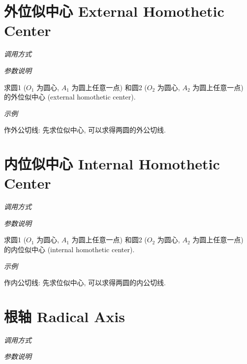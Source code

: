 \section{外位似中心 External Homothetic Center}

\emph{调用方式}

\begin{tcolorbox}{}
\end{tcolorbox}

\emph{参数说明}

求圆1 ($O_1$ 为圆心, $A_1$ 为圆上任意一点)
和圆2 ($O_2$ 为圆心, $A_2$ 为圆上任意一点) 
的外位似中心 (external homothetic center)\cite{HOMO}.

\emph{示例}

作外公切线: 先求位似中心, 可以求得两圆的外公切线.


\section{内位似中心 Internal Homothetic Center}

\emph{调用方式}

\begin{tcolorbox}{}
\end{tcolorbox}

\emph{参数说明}

求圆1 ($O_1$ 为圆心, $A_1$ 为圆上任意一点)
和圆2 ($O_2$ 为圆心, $A_2$ 为圆上任意一点) 
的内位似中心 (internal homothetic center)\cite{HOMO}.

\emph{示例}

作内公切线: 先求位似中心, 可以求得两圆的内公切线.


\section{根轴 Radical Axis}

\emph{调用方式}

\begin{tcolorbox}{}
\end{tcolorbox}

\emph{参数说明}

